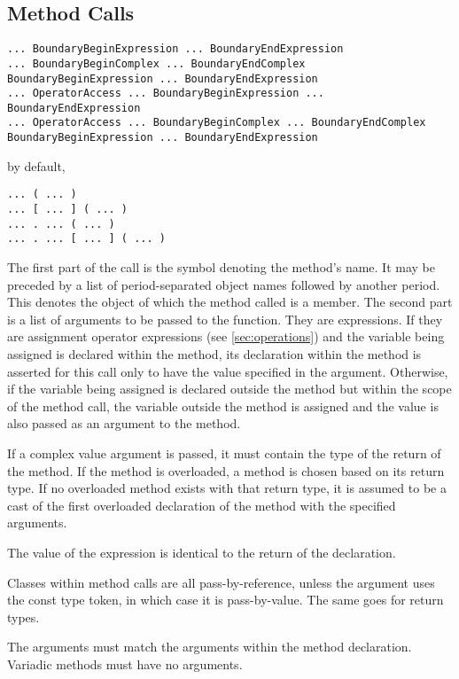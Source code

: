 \documentclass[10pt,a4paper]{article}
\begin{document}
\subsection{Method Calls}
\label{sec:methodCalls}
\begin{verbatim}
... BoundaryBeginExpression ... BoundaryEndExpression
... BoundaryBeginComplex ... BoundaryEndComplex BoundaryBeginExpression ... BoundaryEndExpression
... OperatorAccess ... BoundaryBeginExpression ... BoundaryEndExpression
... OperatorAccess ... BoundaryBeginComplex ... BoundaryEndComplex BoundaryBeginExpression ... BoundaryEndExpression
\end{verbatim}

by default,
\begin{verbatim}
... ( ... )
... [ ... ] ( ... )
... . ... ( ... )
... . ... [ ... ] ( ... )
\end{verbatim}

The first part of the call is the symbol denoting the method's name. It may be preceded by a list of period-separated object names followed by another period. This denotes the object of which the method called is a member. The second part is a list of arguments to be passed to the function. They are expressions. If they are assignment operator expressions (see \ref{sec:operations}) and the variable being assigned is declared within the method, its declaration within the method is asserted for this call only to have the value specified in the argument. Otherwise, if the variable being assigned is declared outside the method but within the scope of the method call, the variable outside the method is assigned and the value is also passed as an argument to the method.

If a complex value argument is passed, it must contain the type of the return of the method. If the method is overloaded, a method is chosen based on its return type. If no overloaded method exists with that return type, it is assumed to be a cast of the first overloaded declaration of the method with the specified arguments.

The value of the expression is identical to the return of the declaration.

Classes within method calls are all pass-by-reference, unless the argument uses the const type token, in which case it is pass-by-value. The same goes for return types. 

The arguments must match the arguments within the method declaration. Variadic methods must have no arguments.
\end{document}
